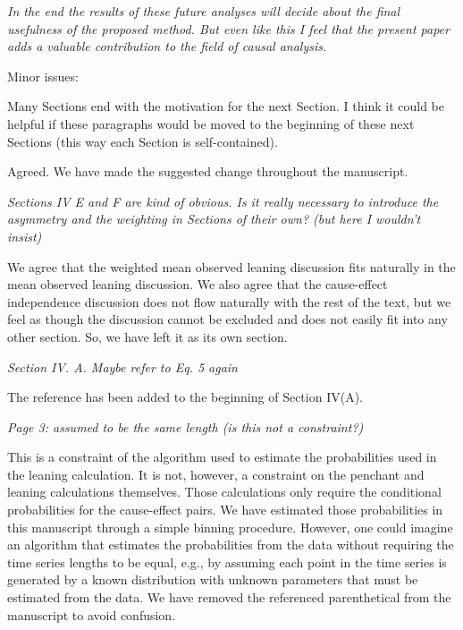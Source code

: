 \documentclass[a4paper,11pt]{article}
\begin{document}
\vspace{0.5cm}
{\em In the end the results of these future analyses will decide about the
final usefulness of the proposed method. But even like this I feel
that the present paper adds a valuable contribution to the field of
causal analysis.

Minor issues:

Many Sections end with the motivation for the next Section. I think it
could be helpful if these paragraphs would be moved to the beginning
of these next Sections (this way each Section is self-contained).}
\vspace{0.5cm}

Agreed.  We have made the suggested change throughout the manuscript.

\vspace{0.5cm}
{\em Sections IV E and F are kind of obvious. Is it really necessary to
introduce the asymmetry and the weighting in Sections of their own?
(but here I wouldn’t insist)}
\vspace{0.5cm}

We agree that the weighted mean observed leaning discussion fits naturally in the mean observed leaning discussion.  We also agree that the cause-effect independence discussion does not flow naturally with the rest of the text, but we feel as though the discussion cannot be excluded and does not easily fit into any other section.  So, we have left it as its own section. 

\vspace{0.5cm}
{\em Section IV. A. Maybe refer to Eq. 5 again}
\vspace{0.5cm}

The reference has been added to the beginning of Section IV(A).

\vspace{0.5cm}
{\em Page 3: assumed to be the same length (is this not a constraint?)}
\vspace{0.5cm}

This is a constraint of the algorithm used to estimate the probabilities used in the leaning calculation.  It is not, however, a constraint on the penchant and leaning calculations themselves.  Those calculations only require the conditional probabilities for the cause-effect pairs.  We have estimated those probabilities in this manuscript through a simple binning procedure.  However, one could imagine an algorithm that estimates the probabilities from the data without requiring the time series lengths to be equal, e.g., by assuming each point in the time series is generated by a known distribution with unknown parameters that must be estimated from the data.  We have removed the referenced parenthetical from the manuscript to avoid confusion.
\end{document}
